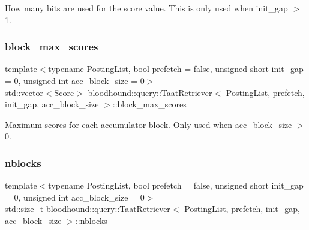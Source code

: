 How many bits are used for the score value. This is only used when init\+\_\+gap $>$ 1. \mbox{\label{classbloodhound_1_1query_1_1TaatRetriever_ac870574844dc3be6c40cf1236e1ff6cc}} 
\subsubsection{\texorpdfstring{block\+\_\+max\+\_\+scores}{block\_max\_scores}}
{\footnotesize\ttfamily template$<$typename Posting\+List, bool prefetch = false, unsigned short init\+\_\+gap = 0, unsigned int acc\+\_\+block\+\_\+size = 0$>$ \\
std\+::vector$<$\hyperlink{structbloodhound_1_1Score}{Score}$>$ \hyperlink{classbloodhound_1_1query_1_1TaatRetriever}{bloodhound\+::query\+::\+Taat\+Retriever}$<$ \hyperlink{classbloodhound_1_1PostingList}{Posting\+List}, prefetch, init\+\_\+gap, acc\+\_\+block\+\_\+size $>$\+::block\+\_\+max\+\_\+scores\hspace{0.3cm}{\ttfamily [protected]}}

Maximum scores for each accumulator block. Only used when acc\+\_\+block\+\_\+size $>$ 0. \mbox{\label{classbloodhound_1_1query_1_1TaatRetriever_a87786d9af7993da498d60304eab245cf}} 
\subsubsection{\texorpdfstring{nblocks}{nblocks}}
{\footnotesize\ttfamily template$<$typename Posting\+List, bool prefetch = false, unsigned short init\+\_\+gap = 0, unsigned int acc\+\_\+block\+\_\+size = 0$>$ \\
std\+::size\+\_\+t \hyperlink{classbloodhound_1_1query_1_1TaatRetriever}{bloodhound\+::query\+::\+Taat\+Retriever}$<$ \hyperlink{classbloodhound_1_1PostingList}{Posting\+List}, prefetch, init\+\_\+gap, acc\+\_\+block\+\_\+size $>$\+::nblocks\hspace{0.3cm}{\ttfamily [protected]}}

